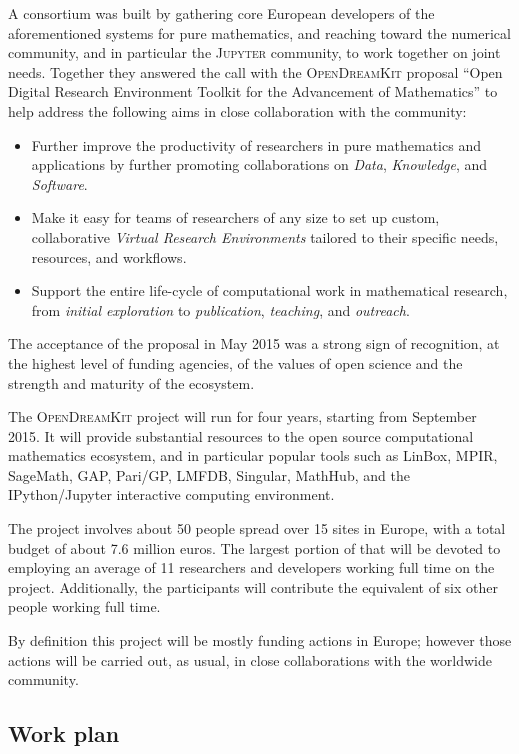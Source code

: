 \documentclass{llncs}
\newcommand{\software}[1]{\textsc{#1}\xspace}
\newcommand{\Jupyter}{\software{Jupyter}}
\newcommand{\ODK}{\software{OpenDreamKit}}
\begin{document}
A consortium was built by gathering core European developers of the
aforementioned systems for pure mathematics, and reaching toward the
numerical community, and in particular the \Jupyter community, to work
together on joint needs.
%
Together they answered the call with the \ODK proposal ``Open
Digital Research Environment Toolkit for the Advancement of
Mathematics'' to help address the following aims in close
collaboration with the community:

\begin{itemize}
\item Further improve the productivity of researchers in pure
  mathematics and applications by further promoting collaborations on
  \emph{Data}, \emph{Knowledge}, and \emph{Software}.
\item Make it easy for teams of researchers of any size to set up custom,
  collaborative \emph{Virtual Research Environments} tailored to their
  specific needs, resources, and workflows.
\item Support the entire life-cycle of computational work in
  mathematical research, from \emph{initial exploration} to
  \emph{publication}, \emph{teaching}, and \emph{outreach}.
\end{itemize}

The acceptance of the proposal in May 2015 was a strong sign of
recognition, at the highest level of funding agencies, of the values
of open science and the strength and maturity of the ecosystem.

The \ODK project will run for four years, starting from September
2015. It will provide substantial resources to the open source
computational mathematics ecosystem, and in particular popular tools
such as LinBox, MPIR, SageMath, GAP, Pari/GP, LMFDB, Singular,
MathHub, and the IPython/Jupyter interactive computing environment.

The project involves about 50 people spread over 15 sites in Europe,
with a total budget of about 7.6 million euros. The largest portion of
that will be devoted to employing an average of 11 researchers and
developers working full time on the project. Additionally, the
participants will contribute the equivalent of six other people
working full time.

By definition this project will be mostly funding actions in Europe;
however those actions will be carried out, as usual, in close
collaborations with the worldwide community.

\subsection{Work plan}
\end{document}
